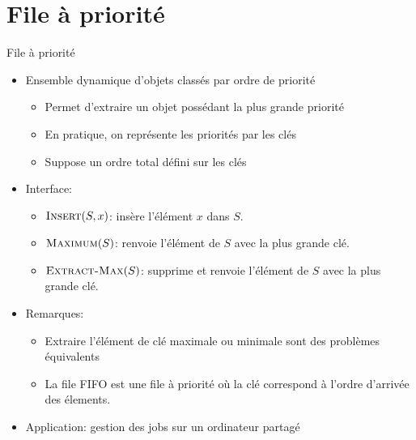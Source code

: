 \section{File à priorité}


\begin{frame}{File à priorité}
\begin{itemize}
\item Ensemble dynamique d'objets classés par ordre de \alert{priorité}
\begin{itemize}
\item Permet d'extraire un objet possédant la plus grande priorité
\item En pratique, on représente les priorités par les clés
\item Suppose un ordre total défini sur les clés
\end{itemize}
\item Interface:
\begin{itemize}
\item $\textnormal{\scshape Insert}(S,x)$: insère l'élément $x$ dans $S$.
\item $\textnormal{\scshape Maximum}(S)$: renvoie l'élément de $S$ avec la plus grande clé.
\item $\textnormal{\scshape Extract-Max}(S)$: supprime et renvoie l'élément de $S$ avec la plus grande clé.

\end{itemize}
\item Remarques:
\begin{itemize}
\item Extraire l'élément de clé maximale ou minimale sont des problèmes équivalents
\item La file FIFO est une file à priorité où la clé correspond à l'ordre d'arrivée des élements.
\end{itemize}
\item Application: gestion des jobs sur un ordinateur partagé
\end{itemize}
\end{frame}


